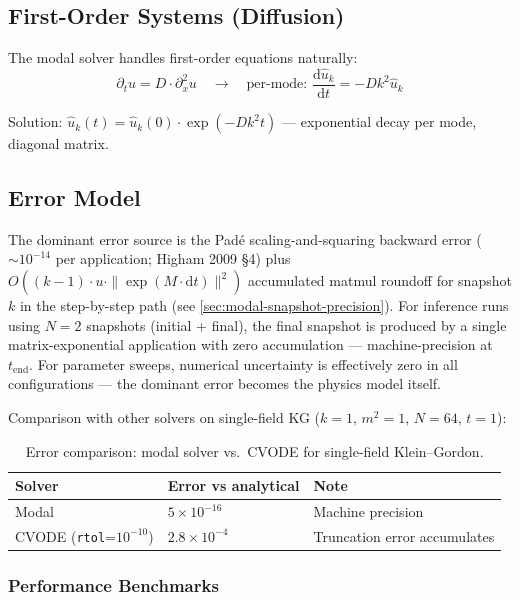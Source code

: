 \subsection{First-Order Systems (Diffusion)}
\label{sec:modal-first-order-systems}

The modal solver handles first-order equations naturally:
\begin{equation}
  \partial_t u = D \cdot \partial_x^2 u \quad\to\quad \text{per-mode: } \frac{\mathrm{d}\hat{u}_k}{\mathrm{d}t} = -D k^2 \hat{u}_k
\end{equation}

Solution: $\hat{u}_k(t) = \hat{u}_k(0) \cdot \exp(-D k^2 t)$ --- exponential decay per mode, diagonal matrix.

\subsection{Error Model}
\label{sec:modal-error-model}

The dominant error source is the Pad\'{e} scaling-and-squaring backward error (${\sim}10^{-14}$ per application; Higham 2009 \S4) plus $O((k-1) \cdot u \cdot \|\exp(M \cdot \mathrm{d}t)\|^2)$ accumulated matmul roundoff for snapshot $k$ in the step-by-step path (see \cref{sec:modal-snapshot-precision}). For inference runs using $N=2$ snapshots (initial + final), the final snapshot is produced by a single matrix-exponential application with zero accumulation --- machine-precision at $t_\mathrm{end}$. For parameter sweeps, numerical uncertainty is effectively zero in all configurations --- the dominant error becomes the physics model itself.

Comparison with other solvers on single-field KG ($k=1$, $m^2=1$, $N=64$, $t=1$):

\begin{table}[htbp]
\centering
\caption{Error comparison: modal solver vs.\ CVODE for single-field Klein--Gordon.}
\label{tab:modal-error}
\begin{tabular}{@{}lll@{}}
\toprule
Solver & Error vs analytical & Note \\
\midrule
Modal & $5\times 10^{-16}$ & Machine precision \\
CVODE (\texttt{rtol}=$10^{-10}$) & $2.8\times 10^{-4}$ & Truncation error accumulates \\
\bottomrule
\end{tabular}
\end{table}

\subsubsection{Performance Benchmarks}
\label{sec:modal-perf-benchmarks}

